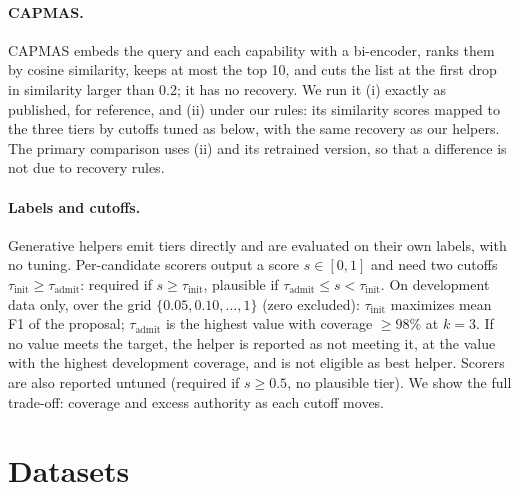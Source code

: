 \documentclass[10pt]{article}
\begin{document}
\paragraph{CAPMAS.} CAPMAS embeds the query and each capability with a bi-encoder, ranks them by cosine similarity, keeps
at most the top 10, and cuts the list at the first drop in similarity larger than 0.2; it has no recovery. We run it
(i) exactly as published, for reference, and (ii) under our rules: its similarity scores mapped to the three tiers by
cutoffs tuned as below, with the same recovery as our helpers. The primary comparison uses (ii) and its retrained version,
so that a difference is not due to recovery rules.

\paragraph{Labels and cutoffs.}\label{sec:cutoffs} Generative helpers emit tiers directly and are evaluated on their own
labels, with no tuning. Per-candidate scorers output a score $s\in[0,1]$ and need two cutoffs
$\tau_{\mathrm{init}}\ge\tau_{\mathrm{admit}}$: required if $s\ge\tau_{\mathrm{init}}$, plausible if
$\tau_{\mathrm{admit}}\le s<\tau_{\mathrm{init}}$. On development data only, over the grid $\{0.05, 0.10,\dots,1\}$ (zero
excluded): $\tau_{\mathrm{init}}$ maximizes mean F1 of the proposal; $\tau_{\mathrm{admit}}$ is the highest value with
coverage $\ge 98\%$ at $k=3$. If no value meets the target, the helper is reported as not meeting it, at the value with the
highest development coverage, and is not eligible as best helper. Scorers are also reported untuned (required if
$s\ge0.5$, no plausible tier). We show the full trade-off: coverage and excess authority as each cutoff moves.

\section{Datasets}\label{sec:data}
\end{document}
